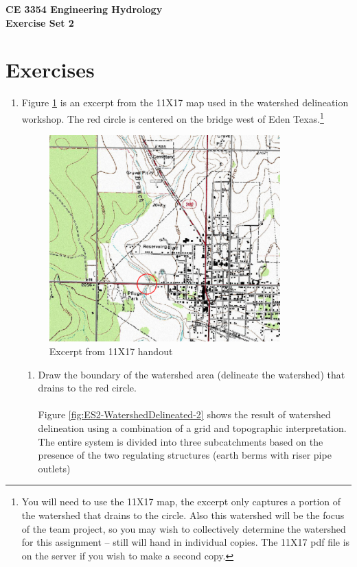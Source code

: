 \documentclass[12pt]{article}
\begin{document}
\begin{center}
{\textbf{{ CE 3354 Engineering Hydrology} \\ {Exercise Set 2}}}
\end{center}
\section*{\small{Exercises}}
\begin{enumerate}
\item Figure \ref{fig:hardinbranch.pdf} is an excerpt from the 11X17 map used in the watershed delineation workshop.  The red circle is centered on the bridge west of Eden Texas.\footnote{You will need to use the 11X17 map, the excerpt only captures a portion of the watershed that drains to the circle.  Also this watershed will be the focus of the team project, so you may wish to collectively determine the watershed for this assignment -- still will hand in individual copies.  The 11X17 pdf file is on the server if you wish to make a second copy.}

\begin{figure}[h!] %
   \centering
   \includegraphics[width=3.5in]{hardinbranch.pdf} 
   \caption{Excerpt from 11X17 handout}
   \label{fig:hardinbranch.pdf}
\end{figure}
\clearpage

\begin{enumerate}
\item  Draw the boundary of the watershed area (delineate the watershed) that drains to the red circle. \\~\\
Figure \ref{fig:ES2-WatershedDelineated-2} shows the result of watershed delineation using a combination of a grid and topographic interpretation.   The entire system is divided into three subcatchments based on the presence of the two regulating structures (earth berms with riser pipe outlets)  


\end{enumerate}
\end{enumerate}
\end{document}
